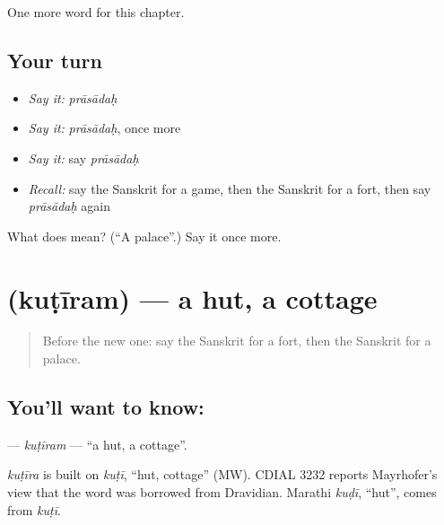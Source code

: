 \begin{grammarlens}[title={What you've built}]
One more word for this chapter.
\end{grammarlens}

\subsection*{Your turn}
\begin{itemize}
\raggedright
  \item \emph{Say it:} \emph{prāsādaḥ}
  \item \emph{Say it:} \emph{prāsādaḥ}, once more
  \item \emph{Say it:} say \emph{prāsādaḥ}
  \item \emph{Recall:} say the Sanskrit for a game, then the Sanskrit for a fort, then say \emph{prāsādaḥ} again
\end{itemize}

\begin{tcolorbox}[breakable,colback=teal!4,colframe=teal!35!black,title={Before you move on}]
What does  mean? (\textquotedblleft{}A palace\textquotedblright{}.) Say it once more.
\end{tcolorbox}
\section[\texorpdfstring{\sk{कुटीरम्} (kuṭīram)}{कुटीरम् (kuṭīram)}]{ (kuṭīram) — a hut, a cottage}

\label{lesson:SA-C250-kutiram}



\begin{quote}
Before the new one: say the Sanskrit for a fort, then the Sanskrit for a palace.
\end{quote}

\subsection*{You'll want to know: }
\textbf{} — \emph{kuṭīram} — \textquotedblleft{}a hut, a cottage\textquotedblright{}.

\begin{cousinweb}
\emph{kuṭīra} is built on \emph{kuṭī}, \textquotedblleft{}hut, cottage\textquotedblright{} (MW). CDIAL 3232 reports Mayrhofer's view that the word was borrowed from Dravidian. Marathi \emph{kuḍī}, \textquotedblleft{}hut\textquotedblright{}, comes from \emph{kuṭī}.
\end{cousinweb}

